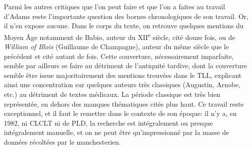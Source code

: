 Parmi les autres critiques que l'on peut faire et que l'on a faites au travail d'Adams reste l'importante question des bornes chronologiques de son travail. Or, il n'en expose aucune. Dans le corps du texte, on retrouve quelques mentions du Moyen Âge notamment de Babio, auteur du XII\textsuperscript{e} siècle, cité douze fois, ou de \textit{William of Blois} (Guillaume de Champagne), auteur du même siècle que le précédent et cité autant de fois. Cette couverture, nécessairement imparfaite, semble par ailleurs se faire au détriment de l'antiquité tardive, dont la couverture semble être issue majoritairement des mentions trouvées dans le TLL, explicant ainsi une concentration sur quelques auteurs très classiques (Augustin, Arnobe, etc.) au détriment de textes médicaux. La période classique est très bien représentée, en dehors des manques thématiques cités plus haut. Ce travail reste exceptionnel, et il faut le remettre dans le contexte de son époque: il n'y a, en 1982, ni CLCLT ni de PLD, la recherche est intégralement ou presque intégralement manuelle, et on ne peut être qu'impressionné par la masse de données récoltées par le manchesterien.



